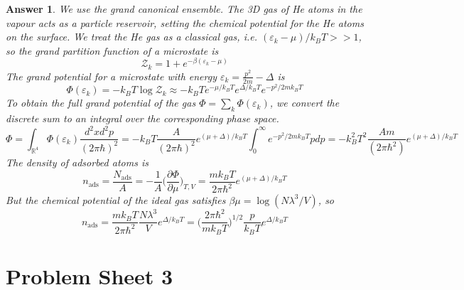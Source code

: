 \documentclass[a4paper]{article}
\newtheorem{ans}{Answer}[section]
\theoremstyle{new}
\begin{document}
\begin{ans}
We use the grand canonical ensemble. The 3D gas of He atoms in the vapour acts as a particle reservoir, setting the chemical potential for the He atoms on the surface. We treat the He gas as a classical gas, i.e. $(\varepsilon_k-\mu)/k_BT>>1$, so the grand partition function of a microstate is
$$\mathcal{Z}_k=1+e^{-\beta(\varepsilon_k-\mu)}$$
The grand potential for a microstate with energy $\varepsilon_k=\frac{p^2}{2m}-\Delta$ is
$$\Phi(\varepsilon_k)=-k_BT\log\mathcal{Z}_k\approx-k_BTe^{-\mu/k_BT}e^{\Delta/k_BT}e^{-p^2/2mk_BT}$$
To obtain the full grand potential of the gas $\Phi=\sum_k\Phi(\varepsilon_k)$, we convert the discrete sum to an integral over the corresponding phase space.
$$\Phi=\int_{\mathbb{R}^4}\Phi(\varepsilon_k)\frac{d^2xd^2p}{(2\pi\hbar)^2}=-k_BT\frac{A}{(2\pi\hbar)^2}e^{(\mu+\Delta)/k_BT}\int_0^\infty e^{-p^2/2mk_BT}pdp=-k_B^2T^2\frac{Am}{(2\pi\hbar^2)}e^{(\mu+\Delta)/k_BT}$$
The density of adsorbed atoms is
$$n_{\text{ads}}=\frac{N_{\text{ads}}}{A}=-\frac{1}{A}\bigg(\frac{\partial\Phi}{\partial\mu}\bigg)_{T,V}=\frac{mk_BT}{2\pi\hbar^2}e^{(\mu+\Delta)/k_BT}$$
But the chemical potential of the ideal gas satisfies $\beta\mu=\log(N\lambda^3/V)$, so
$$n_{\text{ads}}=\frac{mk_BT}{2\pi\hbar^2}\frac{N\lambda^3}{V}e^{\Delta/k_BT}=\bigg(\frac{2\pi\hbar^2}{mk_BT}\bigg)^{1/2}\frac{p}{k_BT}e^{\Delta/k_BT}$$
\end{ans}
\newpage
\section{Problem Sheet 3}
\end{document}
